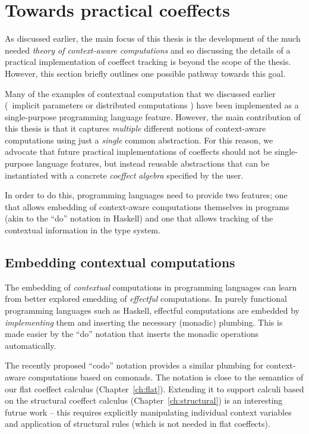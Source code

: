 \section{Towards practical coeffects}
\label{sec:conclusions-impl}

As discussed earlier, the main focus of this thesis is the development of the much needed 
\emph{theory of context-aware computations} and so discussing the details of a practical 
implementation of coeffect tracking is beyond the scope of the thesis. However, this section
briefly outlines one possible pathway towards this goal.

Many of the examples of contextual computation that we discussed earlier (\eg~implicit
parameters \cite{app-implicit-parameters} or distributed computations 
\cite{app-distributed-ml5,app-distributed-links}) have been implemented as a single-purpose
programming language feature. However, the main contribution of this thesis is that it captures
\emph{multiple} different notions of context-aware computations using just a \emph{single}
common abstraction. For this reason, we advocate that future practical implementations of
coeffects should not be single-purpose language features, but instead reusable abstractions that
can be instantiated with a concrete \emph{coeffect algebra} specified by the user.

In order to do this, programming languages need to provide two features; one that allows 
embedding of context-aware computations themselves in programs (akin to the ``do'' notation
in Haskell) and one that allows tracking of the contextual information in the type system.


\subsection{Embedding contextual computations}

The embedding of \emph{contextual} computations in programming languages can learn from better 
explored emedding of \emph{effectful} computations. In purely functional programming languages
such as Haskell, effectful computations are embedded by \emph{implementing} them and inserting the
necessary (monadic) plumbing. This is made easier by the ``do'' notation that inserts the monadic
operations automatically.

The recently proposed ``codo'' notation \cite{comonads-codo} provides a similar plumbing for
context-aware computations based on comonads. The notation is close to the semantics of our 
flat coeffect calculus (Chapter~\ref{ch:flat}). Extending it to support calculi based on the
structural coeffect calculus (Chapter~\ref{ch:structural}) is an interesting futrue work -- 
this requires explicitly manipulating individual context variables and application of structural
rules (which is not needed in flat coeffects).

